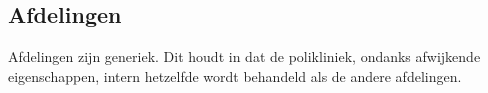 \subsection{Afdelingen}
	Afdelingen zijn generiek. Dit houdt in dat de polikliniek, ondanks afwijkende eigenschappen, intern hetzelfde wordt behandeld als de andere afdelingen.